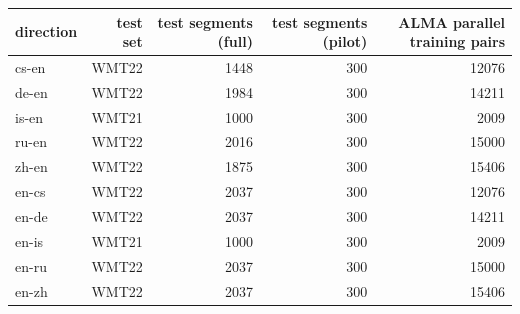 \begin{tabular}{lrrrr}
\toprule
direction & test set & test segments (full) & test segments (pilot) & ALMA parallel training pairs \\
\midrule
cs-en & WMT22 & 1448 & 300 & 12076 \\
de-en & WMT22 & 1984 & 300 & 14211 \\
is-en & WMT21 & 1000 & 300 & 2009 \\
ru-en & WMT22 & 2016 & 300 & 15000 \\
zh-en & WMT22 & 1875 & 300 & 15406 \\
en-cs & WMT22 & 2037 & 300 & 12076 \\
en-de & WMT22 & 2037 & 300 & 14211 \\
en-is & WMT21 & 1000 & 300 & 2009 \\
en-ru & WMT22 & 2037 & 300 & 15000 \\
en-zh & WMT22 & 2037 & 300 & 15406 \\
\bottomrule
\end{tabular}
